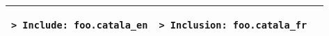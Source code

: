\documentclass[a3paper,landscape]{article}
\begin{document}
\begin{multicols*}{2}
\begin{center}
\begin{tabular}{p{}p{}p{}}
\vspace*{-1.75em}
\begin{verbatim}
> Include: foo.catala_en
\end{verbatim}
\vspace*{-1.75em}
&
\vspace*{-1.75em}
\begin{verbatim}
> Inclusion: foo.catala_fr
\end{verbatim}
\vspace*{-1.75em}
\\
\bottomrule
\end{tabular}
\end{center}
\newcommand*\FancyVerbStartString{```catala}
\newcommand*\FancyVerbStopString{```}















\end{multicols*}
\end{document}
